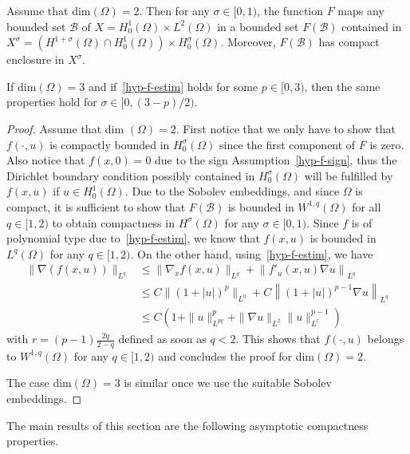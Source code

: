 \documentclass[10pt]{amsart}
\theoremstyle{definition}\newtheorem{defi}[theo]{Definition}\newtheorem{rema}[theo]{Remark}\newtheorem{exam}[theo]{Example}\newtheorem{exem}[theo]{Example}\newtheorem{nota}[theo]{Notation}
\newcommand{\Bc}{\mathcal{B}}
\newcommand{\grad}{\nabla}
\begin{document}
\begin{prop}\label{prop-compact-F}
Assume that dim$(\Omega)=2$. Then for any $\sigma\in [0,1)$, the function $F$ maps any bounded set $\Bc$ of $X=H^1_0(\Omega)\times L^2(\Omega)$ in a bounded set $F(\Bc)$ contained in $X^\sigma= (H^{1+\sigma}(\Omega)\cap H^1_0(\Omega))\times H^\sigma_0(\Omega)$. Moreover, $F(\Bc)$ has compact enclosure in $X^\sigma$.

If dim$(\Omega)=3$ and if~\eqref{hyp-f-estim} holds for some $p\in [0,3)$, then the same properties hold for $\sigma\in [0,(3-p)/2)$.
\end{prop}
\begin{proof}
Assume that dim $(\Omega)=2$. First notice that we only have to show that $f(\cdot,u)$ is compactly bounded in $H^\sigma_0(\Omega)$ since the first component of $F$ is zero. Also notice that $f(x,0)=0$ due to the sign Assumption~\eqref{hyp-f-sign}, thus the Dirichlet boundary condition possibly contained in $H^\sigma_0(\Omega)$ will be fulfilled by $f(x,u)$ if $u\in H^1_0(\Omega)$. Due to the Sobolev embeddings, and since $\Omega$ is compact, it is sufficient to show that $F(\Bc)$ is bounded in $W^{1,q}(\Omega)$ for all $q\in [1,2)$ to obtain compactness in $H^\sigma(\Omega)$ for any $\sigma\in [0,1)$. Since $f$ is of polynomial type due to~\eqref{hyp-f-estim}, we know that $f(x,u)$ is bounded in $L^q(\Omega)$ for any $q\in [1,2)$. On the other hand, using~\eqref{hyp-f-estim}, we have
\begin{align*}
\|\grad(f(x,u))\|_{L^q} & \leq \|\grad_xf(x,u)\|_{L^q} + \left\|f'_u(x,u)\grad u\right\|_{L^q}\\
& \leq C \|(1+|u|)^p \|_{L^q} + C \left\|(1+|u|)^{p-1} \grad u\right\|_{L^q}\\
& \leq C\left(1+\|u\|_{L^{pq}}^p + \|\grad u\|_{L^2} \|u\|^{p-1}_{L^r}\right)
\end{align*}
with $r=(p-1)\frac {2q}{2-q}$ defined as soon as $q<2$. This shows that $f(\cdot,u)$ belongs to $W^{1,q}(\Omega)$ for any $q\in [1,2)$ and concludes the proof for dim$(\Omega)=2$.

The case dim$(\Omega)=3$ is similar once we use the suitable Sobolev embeddings.
\end{proof}


The main results of this section are the following asymptotic compactness properties.
\end{document}
